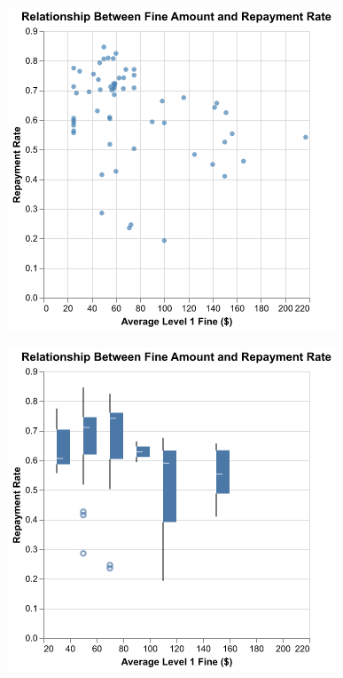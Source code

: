 \documentclass[
  letterpaper,
  DIV=11,
  numbers=noendperiod]{scrartcl}
\begin{document}
\includegraphics{ps2_final_files/figure-pdf/cell-21-output-1.png}

\includegraphics{ps2_final_files/figure-pdf/cell-21-output-2.png}
\end{document}
